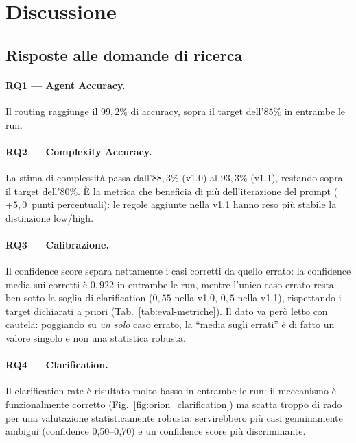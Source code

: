 \section{Discussione}
\label{sec:eval-discussione}

\subsection{Risposte alle domande di ricerca}
\label{subsec:eval-rq}

\paragraph{RQ1 --- Agent Accuracy.} Il routing raggiunge il $99{,}2\%$ di accuracy,
sopra il target dell'$85\%$ in entrambe le run.

\paragraph{RQ2 --- Complexity Accuracy.} La stima di complessità passa dall'$88{,}3\%$ (v1.0) al $93{,}3\%$ (v1.1),
restando sopra il target dell'$80\%$. È la metrica che beneficia di più dell'iterazione del prompt ($+5{,}0$~punti percentuali):
le regole aggiunte nella v1.1 hanno reso più stabile la distinzione low/high.

\paragraph{RQ3 --- Calibrazione.} Il confidence score separa nettamente i casi corretti da quello errato:
la confidence media sui corretti è $0{,}922$ in entrambe le run, mentre l'unico caso errato resta ben sotto la soglia di clarification ($0{,}55$ nella v1.0, $0{,}5$ nella v1.1),
rispettando i target dichiarati a priori (Tab.~\ref{tab:eval-metriche}). Il dato va però letto con cautela: poggiando su \emph{un solo} caso errato, la ``media sugli errati'' è di fatto un valore singolo e non una statistica robusta.

\paragraph{RQ4 --- Clarification.} Il clarification rate è risultato molto basso in entrambe le run: il meccanismo è funzionalmente corretto (Fig.~\ref{fig:orion_clarification})
ma scatta troppo di rado per una valutazione statisticamente robusta: servirebbero più casi genuinamente ambigui (confidence 0,50--0,70) e un confidence score più discriminante.

